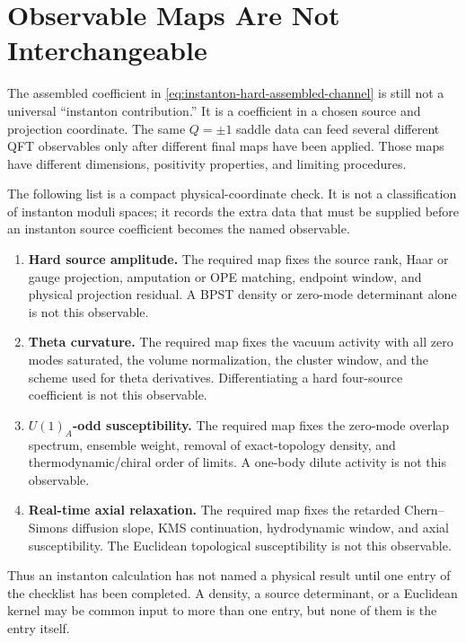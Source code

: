\section{Observable Maps Are Not Interchangeable}
\label{sec:instanton-observable-handoffs}

The assembled coefficient in
\eqref{eq:instanton-hard-assembled-channel} is still not a universal
``instanton contribution.''  It is a coefficient in a chosen source and
projection coordinate.  The same \(Q=\pm1\) saddle data can feed several
different QFT observables only after different final maps have been applied.
Those maps have different dimensions, positivity properties, and limiting
procedures.

The following list is a compact physical-coordinate check.  It is not a
classification of instanton moduli spaces; it records the extra data that must
be supplied before an instanton source coefficient becomes the named
observable.
\begin{enumerate}[leftmargin=*]
\item \textbf{Hard source amplitude.}  The required map fixes the source rank,
Haar or gauge projection, amputation or OPE matching, endpoint window, and
physical projection residual.  A BPST density or zero-mode determinant alone is
not this observable.
\item \textbf{Theta curvature.}  The required map fixes the vacuum activity
with all zero modes saturated, the volume normalization, the cluster window,
and the scheme used for theta derivatives.  Differentiating a hard four-source
coefficient is not this observable.
\item \textbf{\(U(1)_A\)-odd susceptibility.}  The required map fixes the
zero-mode overlap spectrum, ensemble weight, removal of exact-topology density,
and thermodynamic/chiral order of limits.  A one-body dilute activity is not
this observable.
\item \textbf{Real-time axial relaxation.}  The required map fixes the retarded
Chern--Simons diffusion slope, KMS continuation, hydrodynamic window, and axial
susceptibility.  The Euclidean topological susceptibility is not this
observable.
\end{enumerate}
Thus an instanton calculation has not named a physical result until one entry
of the checklist has been completed.  A density, a source determinant, or a
Euclidean kernel may be common input to more than one entry, but none of them
is the entry itself.

